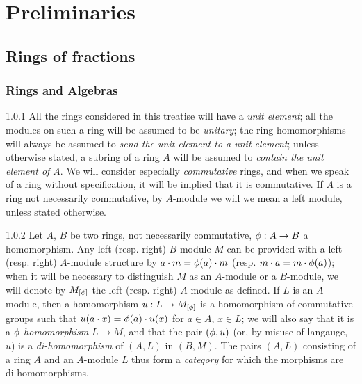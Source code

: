 \setcounter{chapter}{-1}
\chapter{Preliminaries}
\label{chapter-0-prelim}

\section{Rings of fractions}
\label{0-prelim-1}

\setcounter{subsection}{-1}
\subsection{Rings and Algebras}
\label{0-prelim-1.0}

\begin{env}{1.0.1}
\label{env-0.1.0.1}
All the rings considered in this treatise will have a \emph{unit element}; all
the modules on such a ring will be assumed to be \emph{unitary}; the ring
homomorphisms will always be assumed to \emph{send the unit element to a unit
element}; unless otherwise stated, a subring of a ring $A$ will be assumed to
\emph{contain the unit element of $A$}. We will consider especially
\emph{commutative} rings, and when we speak of a ring without specification, it
will be implied that it is commutative. If $A$ is a ring not necessarily
commutative, by $A$-module we will we mean a left module, unless stated
otherwise.
\end{env}

\begin{env}{1.0.2}
\label{env-0.1.0.2}
Let $A$, $B$ be two rings, not necessarily commutative, $\phi:A\to B$ a
homomorphism. Any left (resp. right) $B$-module $M$ can be provided with a left
(resp. right) $A$-module structure by $a\cdot m=\phi(a)\cdot m$
(resp. $m\cdot a=m\cdot\phi(a)$); when it will be necessary to distinguish $M$
as an $A$-module or a $B$-module, we will denote by $M_{[\phi]}$ the left
(resp. right) $A$-module as defined. If $L$ is an $A$-module, then a
homomorphism $u:L\to M_{[\phi]}$ is a homomorphism of commutative groups such
that $u(a\cdot x)=\phi(a)\cdot u(x)$ for $a\in A$, $x\in L$; we will also say
that it is a $\phi$-\emph{homomorphism} $L\to M$, and that the pair $(\phi,u)$
(or, by misuse of langauge, $u$) is a \emph{di-homomorphism} of $(A,L)$ in
$(B,M)$. The pairs $(A,L)$ consisting of a ring $A$ and an $A$-module $L$ thus
form a \emph{category} for which the morphisms are di-homomorphisms.
\end{env}

